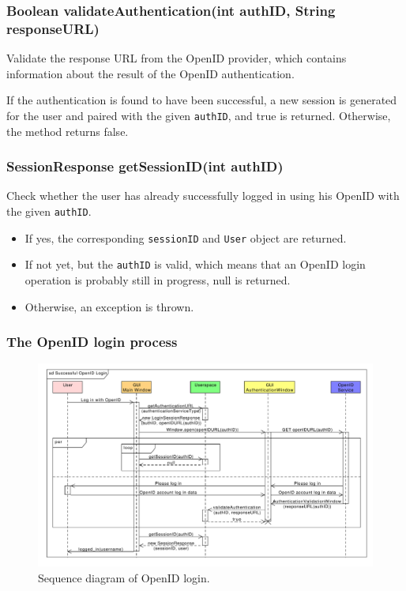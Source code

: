 {\subsubsection{Boolean validateAuthentication(int authID, String responseURL)}

Validate the response URL from the OpenID provider, which contains information about the result of the OpenID authentication.

If the authentication is found to have been successful, a new session is generated for the user and paired with the given {\tt authID}, and true is returned.
Otherwise, the method returns false.

\subsubsection{SessionResponse getSessionID(int authID)}

Check whether the user has already successfully logged in using his OpenID with the given {\tt authID}.

\begin{itemize}
\item If yes, the corresponding {\tt sessionID} and {\tt User} object are returned.
\item If not yet, but the {\tt authID} is valid, which means that an OpenID login operation is probably still in progress, null is returned.
\item Otherwise, an exception is thrown.
\end{itemize}

\subsubsection{The OpenID login process}
\label{subsubsec:gui:openid}

\begin{figure}[h]
\begin{center}
\includegraphics[scale=0.55, angle=90]{figures/openid_login_sequence.pdf}
\end{center}
\caption{Sequence diagram of OpenID login.}\label{rpc:sd:openid_login}
\end{figure}

}
